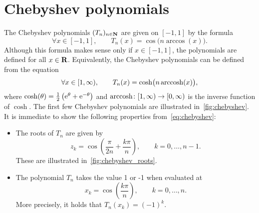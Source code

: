 \chapter{Chebyshev polynomials}%
\label{cha:Chebyshev polynomials}

The Chebyshev polynomials $(T_n)_{n \in \mathbf N}$ are given on $[-1, 1]$ by the formula
\begin{equation}
    \label{eq:chebyshev}
    \forall x \in [-1, 1], \qquad
    T_n(x) = \cos \bigl(n \arccos(x)\bigr).
\end{equation}
Although this formula makes sense only if $x \in [-1, 1]$,
the polynomials are defined for all $x \in \mathbf R$.
Equivalently,
the Chebyshev polynomials can be defined from the equation
\begin{equation}
    \label{eq:chebyshev_cosh}
    \forall x \in [1, \infty), \qquad
    T_n(x) = \cosh \bigl(n \operatorname{arccosh}(x)\bigr),
\end{equation}
where $\cosh(\theta) = \frac{1}{2} \left( \mathrm e^\theta + \mathrm e^{-\theta} \right)$
and $\operatorname{arccosh}\colon [1, \infty) \to [0, \infty)$ is the inverse function of $\cosh$.
The first few Chebyshev polynomials are illustrated in~\cref{fig:chebyshev}.
It is immediate to show the following properties from~\eqref{eq:chebyshev}:
\begin{itemize}
    \item
        The roots of $T_n$ are given by
        \[
            z_k = \cos \left( \frac{\pi}{2n} + \frac{k\pi}{n} \right), \qquad k = 0, \dotsc, n-1.
        \]
        These are illustrated in~\cref{fig:chebyshev_roots}.

    \item
        The polynomial $T_n$ takes the value 1 or -1 when evaluated at
        \begin{equation}
            \label{eq:chebyshev_maxima}
            x_k = \cos \left( \frac{k \pi}{n} \right), \qquad k = 0, \dotsc, n.
        \end{equation}
        More precisely, it holds that $T_n(x_k) = (-1)^k$.
\end{itemize}


